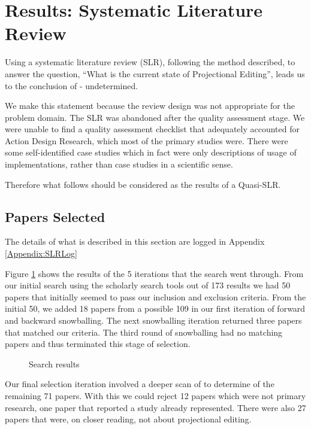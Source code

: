 \section{Results: Systematic Literature Review}\label{section:Results_SLR}

Using a systematic literature review (SLR), following the method described, to answer the question, ``What is the current state of Projectional Editing'', leads us to the conclusion of - undetermined.

We make this statement because the review design was not appropriate for the problem domain.
The SLR was abandoned after the quality assessment stage.
We were unable to find a quality assessment checklist that adequately accounted for Action Design Research, which most of the primary studies were.
There were some self-identified case studies which in fact were only descriptions of usage of implementations, rather than case studies in a scientific sense.

Therefore what follows should be considered as the results of a Quasi-SLR.

\subsection{Papers Selected}
The details of what is described in this section are logged in Appendix \ref{Appendix:SLRLog}

Figure \ref{fig:search_results} shows the results of the 5 iterations that the search went through.
From our initial search using the scholarly search tools out of 173 results we had 50 papers that initially seemed to pass our inclusion and exclusion criteria.
From the initial 50, we added 18 papers from a possible 109 in our first iteration of forward and backward snowballing.
The next snowballing iteration returned three papers that matched our criteria.
The third round of snowballing had no matching papers and thus terminated this stage of selection.

\begin{figure}[htbp]
    \centering
    \caption{Search results}
    \label{fig:search_results}
\end{figure}


Our final selection iteration involved a deeper scan of to determine of the remaining 71 papers.
With this we could reject 12 papers which were not primary research, one paper that reported a study already represented.
There were also 27 papers that were, on closer reading, not about projectional editing.

